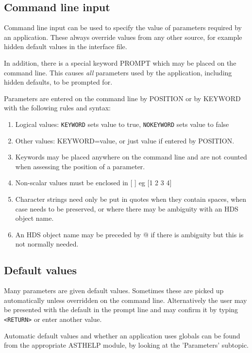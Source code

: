 \documentclass{book}
\renewcommand{\_}{{\tt\char'137}}     %
\begin{document}
\subsection{Command line input}
Command line input can be used to specify the value of parameters
required by an application. These always override values from any
other source, for example hidden default values in the interface
file.
 
In addition, there is a special keyword PROMPT which may be
placed on the command line. This causes {\em all} parameters used by
the application, including hidden defaults, to be prompted for.
 
Parameters are entered on the command line by POSITION or by
KEYWORD with the following rules and syntax:
 
 
\begin{enumerate}
\item Logical values: {\tt KEYWORD} sets value to true,
{\tt NOKEYWORD} sets value to false
 
\item Other values: KEYWORD=value,
or just value if entered by POSITION.
 
\item Keywords may be placed anywhere on the command line
and are not counted when assessing the position of a
parameter.
 
\item Non-scalar values must be enclosed in [ ] eg [1 2 3 4]
 
\item Character strings need only be put in quotes when
they contain spaces, when case needs to be preserved, or
where there may be ambiguity with an HDS object name.
 
\item An HDS object name may be preceded by @ if there is
ambiguity but this is not normally needed.
 
\end{enumerate}
\subsection{Default values}
Many parameters are given default values. Sometimes these are
picked up automatically unless overridden on the command line.
Alternatively the user may be presented with the default in the
prompt line and may confirm it by typing \verb+<RETURN>+ or enter
another value.
 
Automatic default values and whether an application uses globals
can be found from the appropriate ASTHELP module, by looking at
the 'Parameters' subtopic.
 
\end{document}
